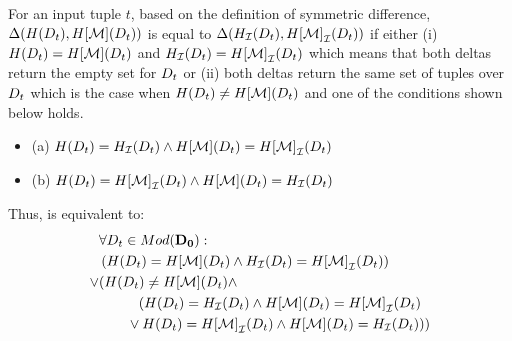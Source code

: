 For an input tuple $t$, based on the definition of symmetric difference, $\Delta(H(D_{t}),H[\mathcal{M}](D_{t}))$ is equal to $\Delta({H}_{\mathcal{I}}(D_{t}),{H[\mathcal{M}]}_{\mathcal{I}}(D_{t}))$ if either (i) $H(D_{t}) = H[\mathcal{M}](D_{t})$ and ${H}_{\mathcal{I}}(D_{t}) = {H[\mathcal{M}]}_{\mathcal{I}}(D_{t})$ which means that both deltas return the empty set for $D_{t}$ or (ii) both deltas return the same set of tuples over $D_{t}$ which is the case when $H(D_{t}) \neq H[\mathcal{M}](D_{t})$ and one of the conditions shown below holds.
\begin{itemize}
\item (a) $H(D_{t}) = {H}_{\mathcal{I}}(D_{t}) \land H[\mathcal{M}](D_{t}) =  {H[\mathcal{M}]}_{\mathcal{I}}(D_{t})$
\item (b)
$H(D_{t}) = {H[\mathcal{M}]}_{\mathcal{I}}(D_{t}) \land H[\mathcal{M}](D_{t}) = {H}_{\mathcal{I}}(D_{t})$
\end{itemize}
%
 Thus,  is equivalent to:
%
\begin{align}
  \label{eq:slice-test-cases}
  \begin{split}
    &\forall D_{t} \in Mod({\mathbf{D_0}}):\\
    &\left(H(D_{t}) = H[\mathcal{M}](D_{t}) \land {H}_{\mathcal{I}}(D_{t}) = {H[\mathcal{M}]}_{\mathcal{I}}(D_{t})\right)   \\
    \lor &(H(D_{t}) \neq H[\mathcal{M}](D_{t}) \land\\
    &\hspace{1cm}(
           H(D_{t}) = {H}_{\mathcal{I}}(D_{t}) \land H[\mathcal{M}](D_{t}) =  {H[\mathcal{M}]}_{\mathcal{I}}(D_{t})  \\
  &\hspace{0.7cm}\lor H(D_{t}) = {H[\mathcal{M}]}_{\mathcal{I}}(D_{t}) \land H[\mathcal{M}](D_{t}) = {H}_{\mathcal{I}}(D_{t})))
  \end{split}
\end{align}
%
